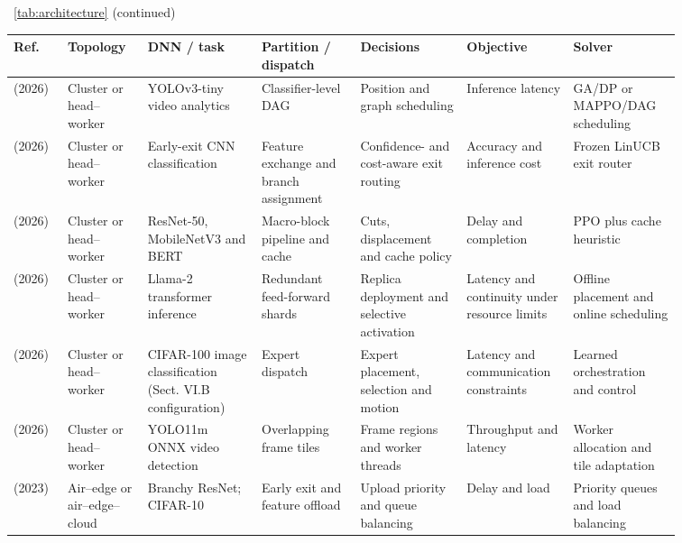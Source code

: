 \begin{table}[!tp]
\centering\footnotesize \MakeUppercase{\tablename}\ \ref{tab:architecture} (continued)\par\smallskip
\centering
\fontsize{8}{10}\selectfont\setlength{\tabcolsep}{2.5pt}\renewcommand{\arraystretch}{1.08}
\begin{tabular}{@{}Y{0.0705\linewidth}Y{0.1043\linewidth}Y{0.1589\linewidth}Y{0.1363\linewidth}Y{0.1419\linewidth}Y{0.1175\linewidth}Y{0.1307\linewidth}@{}}
\toprule
Ref. & Topology & DNN / task & Partition / dispatch & Decisions & Objective & Solver \\
\midrule
\cite{R0048}\newline\mbox{(2026)} & Cluster or head--worker & YOLOv3-tiny video analytics & Classifier-level DAG & Position and graph scheduling & Inference latency & GA\allowbreak{}/DP or MAPPO\allowbreak{}/DAG scheduling \\
\cite{R0075}\newline\mbox{(2026)} & Cluster or head--worker & Early-exit CNN classification & Feature exchange and branch assignment & Confidence- and cost-aware exit routing & Accuracy and inference cost & Frozen LinUCB exit router \\
\cite{R0095}\newline\mbox{(2026)} & Cluster or head--worker & ResNet-50, MobileNetV3 and BERT & Macro-block pipeline and cache & Cuts, displacement and cache policy & Delay and completion & PPO plus cache heuristic \\
\cite{R0110}\newline\mbox{(2026)} & Cluster or head--worker & Llama-2 transformer inference & Redundant feed-forward shards & Replica deployment and selective activation & Latency and continuity under resource limits & Offline placement and online scheduling \\
\cite{R0118}\newline\mbox{(2026)} & Cluster or head--worker & CIFAR-100 image classification (Sect. VI.B configuration) & Expert dispatch & Expert placement, selection and motion & Latency and communication constraints & Learned orchestration and control \\
\cite{R0125}\newline\mbox{(2026)} & Cluster or head--worker & YOLO11m ONNX video detection & Overlapping frame tiles & Frame regions and worker threads & Throughput and latency & Worker allocation and tile adaptation \\
\cite{R0089}\newline\mbox{(2023)} & Air--edge or air--edge--cloud & Branchy ResNet; CIFAR-10 & Early exit and feature offload & Upload priority and queue balancing & Delay and load & Priority queues and load balancing \\

\end{tabular}
\end{table}
